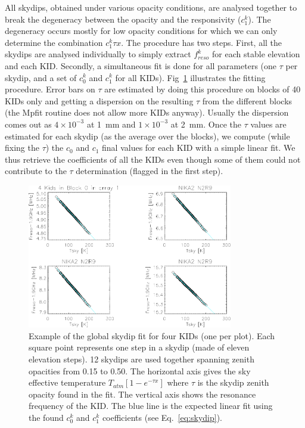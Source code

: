 All skydips, obtained under various opacity conditions, are analysed
together to break the degeneracy between the opacity and the
responsivity ($c_1^k$). The degeneracy occurs mostly for low opacity
conditions for which we can only determine the combination $c_1^k \tau
x$. The procedure has two steps.  First, all the skydips are analysed
individually to simply extract $f_{reso}^k$ for each stable elevation
and each KID. Secondly, a simultaneous fit is done for all parameters
(one $\tau$ per skydip, and a set of $c_0^k$ and $c_1^k$ for all
KIDs). Fig~\ref{fig:skydipfitexample} illustrates the fitting
procedure.  Error bars on $\tau$ are estimated by doing this procedure
on blocks of 40 KIDs only and getting a dispersion on the resulting
$\tau$ from the different blocks (the Mpfit routine does not allow
more KIDs anyway). Usually the dispersion comes out as $4\times
10^{-3}$ at 1~mm and $1\times 10^{-3}$ at 2~mm. Once the $\tau$ values
are estimated for each skydip (as the average over the blocks), we
compute (while fixing the $\tau$) the $c_0$ and $c_1$ final values for
each KID with a simple linear fit. We thus retrieve the coefficients
of all the KIDs even though some of them could not contribute to the
$\tau$ determination (flagged in the first step).


\begin{figure}[ht!]
\begin{center}
\includegraphics[clip=true,width=0.8\textwidth]{Figures/Opacity/test_allskd4_N2R9v5_5-crop.pdf}
\caption[]{Example of the global skydip fit for four KIDs (one per plot).
Each square point represents one step in a skydip (made of eleven
elevation steps). 12 skydips are used together spanning zenith
opacities from 0.15 to 0.50. The horizontal axis gives the sky
effective temperature $T_{atm}[1-e^{-\tau x}]$ where $\tau$ is the
skydip zenith opacity found in the fit. The vertical axis shows the
resonance frequency of the KID. The blue line is the expected linear
fit using the found $c_0^k$ and $c_1^k$ coefficients (see
Eq.~\ref{eq:skydip}). }
\label{fig:skydipfitexample}
\end{center}
\end{figure}

